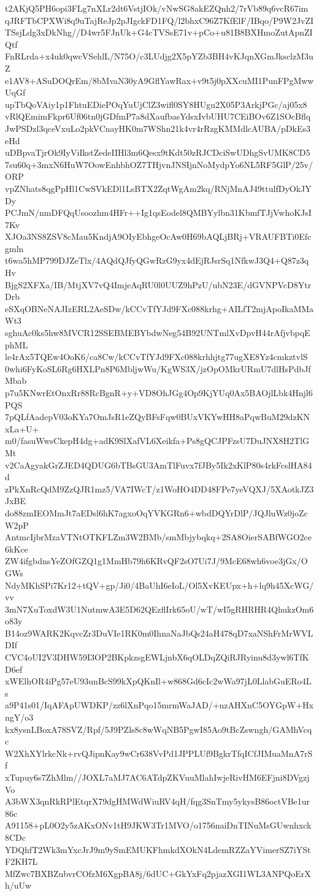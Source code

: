 t2AKjQ5PH6opi3FLg7nXLr2dt6VstjIOk/vNwSG8akEZQnh2/7rVb89q6vcR67im
qJRFTbCPXWi8q9uTajReJp2pJIgckFD1FQ/l2bhxC96Z7KfElF/IBqo/P9W2JvZI
TSsjLdg3xDkNhg//D4wr5FJnUk+G4cTVSsE71v+pCo+u81B8BXHmoZutApnZIQtf
FnRLrda+x4uk0qwcVSehlL/N75O/c3LUdjg2X5pYZb3BH4vKJqnXGmJksclzM3uZ
e1AV8+ASuDOQrEm/8bMvaN30yA9GflYawRax+v9t5j0pXXcuMI1PunFPgMwwUqGf
upTbQoVAiy1p1FhtuEDiePOqYuUjClZ3wifl0SY8HUgu2X05P3ArkjPGc/aj05x8
vRlQEmimFkpr6Uf06tn0jGDfmP7a8dXaufbasYdsxIvbUHU7CEiBOv6Z1SOcBflq
JwPSDzl3qceVxuLo2pkVCnayHK0m7WShn21k4vr4rRzgKMMdlcAUBA/pDkEs3eHd
uDBpvaTjrOk9IyViIkstZedeIIHl3m6Qesx9tKdt50zRJCDciSwUDhgSvUMK8CD5
7su60q+3mxN6HuW7OowEnhbhOZ7THjvnJNSIjnNoMydpYo6NL5RF5GlP/25v/ORP
vpZNhats8qgPpHl1CwSVkEDl1LsBTX2ZqtWgAm2kq/RNjMnAJ49ttulfDyOkJYDy
PCJmN/nmDFQqUsoozhm4HFr++Ig1qsEodel8QMBYylbn31KbmfTJjVwhoKJsI7Kv
XJOa3NS8ZSV8cMau5KndjA9OIyEbhgeOcAw0H69bAQLjBRj+VRAUFBTi0Efcgmln
t6wa5hMP799DJZeTlx/4AQdQJfyQGwRzG9yx4dEjRJsrSq1NfkwJ3Q4+Q87z3qHv
BjgS2XFXa/IB/MtjXV7vQ4ImjeAqRU0l0UUZ9hPzU/ubN23E/dGVNPVcD8YtrDrb
eSXqOBNeNAJIzERL2AeSDw/kCCvTfYJd9FXc088krhg+AILfT2mjApoIkaMMaWt3
sghuAc0ks5hw8MVCR12SSEBMEBYbdwNeg54B92UNTmlXvDpvH44rAfjvbpqEphML
le4rAx5TQEw4OoK6/ca8Cw/kCCvTfYJd9FXc088krhhjtg77ugXE8Yz4cmkztvlS
0whi6FyKoSL6Rg6HXLPn8P6MbljwWu/KgWS3X/jzOpOMkrURmU7dlHsPdbJfMbab
p7u5KNwrEtOnxRr88RcBgnR+y+VD8OhJGg4Op9KjYUq0Ax5BAOjlLbk4Hnjl6PQS
7pQLfAadepV03oKYa7OmJsR1eZQyBFsFqw0BUxVKYwHH8aPqwBuM29dzKNxLa+U+
m0/fasuWwsCkepH4dg+adK9SlXafVL6Xeikfa+Ps8gQCJPFzsU7DuJNX8H2TlGMt
v2CaAgyakGrZJED4QDUG6bTBsGU3AmTlFuvx7fJBy5Ik2xKlP80s4rkFcslHA84d
zPkXnRcQdM9ZzQJR1mz5/VA7IWcT/z1WoHO4DD48FPe7yeVQXJ/5XAotkJZ3JxBE
do88zmIEOMmJt7aEDsl6hK7agxoOqYVKGRn6+wbdDQYrDlP/JQJluWz0joZcW2pP
AntmcIjbrMzaVTNtOTKFLZm3W2BMb/smMbjybqkq+2SA8OierSABfWGO2ce6kKce
ZW4ifgbdnsYeZOfGZQ1g1MmHb79h6KRvQF2sO7Ui7J/9McE68wh6voe3jGx/OGWs
NdyMKhSPi7Kr12+tQV+gp/Ji0/4BaUhI6eIoL/Ol5XvKEUpx+h+lq9h45XcWG/vv
3mN7XuToxdW3U1NutmwA3E5D62QEzflIrk65oU/wT/wI5gRHRHR4QhukzOm6o83y
B14oz9WARK2KqvcZr3DuVIe1RK0m0IhnaNaJbQs24aH478qD7xaNShFrMrWVLDIf
CVC4oUI2V3DHW59I3OP2BKpkzsgEWLjnbX6qOLDqZQiRJRyinu8d3ywl6TfKD6ef
xWElhOR4iPg57eU93unBcS99kXpQKnIl+w868Gd6cIc2wWa97jL0LlabGuERo4Ls
a9P41s01/IqAFApUWDKP/zz6lXnPqo15mrmWaJAD/+nzAHXnC5OYGpW+HxngY/o3
kx8ysnLBoxA78SVZ/Rpf/5J9PZls8c8wWqNB5PgwI85Ao9tBcZswngh/GAMhVcqc
W2XhXYlrkcNk+rvQJipnKay9wCr638VvPd1JPPLUf9BgkrTfqICfJIMuaMnA7rSf
xTupuy6s7ZhMlm//JOXL7aMJ7AC6ATdpZKVuuMlahIwjeRivHM6EFjni8DVgzjVo
A3bWX3qnRkRPlEtqrX79dgHMWdWiuRV4qH/fqg3SnTmy5ykysB86octVBe1ur86c
A91158+pL0O2y5zAKxONv1tH9JKW3Tr1MVO/o1756naiDnTINuMsGUwnhxck8CDc
YDQhfT2Wk3mYxcJrJ9m9ySmEMUKFhmkdXOkN4LdemRZZaYVimerSZ7iYStF2KH7L
MfZwc7BXBZubvrCOfzM6XgpBA8j/6dUC+GkYxFq2pjazXGI1WL3ANPQoErXh/uUw
